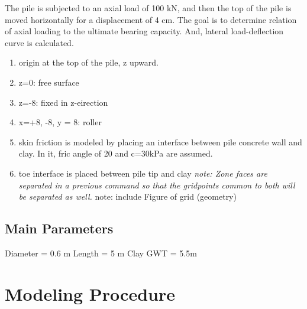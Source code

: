 \documentclass[a4paper, nobind]{templates/ociamthesis}
\providecommand{\tightlist}{%
  \setlength{\itemsep}{0pt}\setlength{\parskip}{0pt}}
\begin{document}
The pile is subjected to an axial load of 100 kN,
and then the top of the pile is moved horizontally for a displacement of 4 cm.
The goal is to determine relation of axial loading to the ultimate bearing capacity.
And, lateral load-deflection curve is calculated.

\begin{enumerate}
\def\labelenumi{\arabic{enumi})}
\tightlist
\item
  origin at the top of the pile, z upward.
\item
  z=0: free surface
\item
  z=-8: fixed in z-eirection
\item
  x=+8, -8, y = 8: roller
\item
  skin friction is modeled by placing an interface
  between pile concrete wall and clay.
  In it, fric angle of 20 and c=30kPa are assumed.
\item
  toe interface is placed between pile tip and clay
  \emph{note: Zone faces are separated in a previous command so that the gridpoints common to both will be separated as well.
  }note: include Figure of grid (geometry)
\end{enumerate}

\hypertarget{main-parameters}{%
\subsection{Main Parameters}\label{main-parameters}}

Diameter = 0.6 m
Length = 5 m
Clay
GWT = 5.5m

\hypertarget{modeling-procedure}{%
\section{Modeling Procedure}\label{modeling-procedure}}
\end{document}
